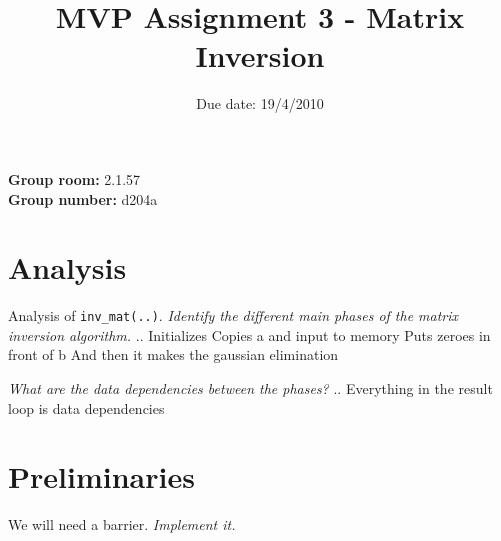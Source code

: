 \documentclass{article}
\title{MVP Assignment 3 - Matrix Inversion}
\date{Due date: 19/4/2010}
\begin{document}
\maketitle


\newcommand{\question}[1]{}
\newcommand{\answer}[1]{{#1}}

%
%
\answer{
\begin{flushleft}
{\bf Group room:} 2.1.57\\
{\bf Group number:} d204a\\
\end{flushleft}
}

\section{Analysis}

\question{
First we will analyse the code from \texttt{pmatrics.c} that you
discovered in the previous assignment. The example has been updated
for this assignment. The purpose is to parallize it using
\emph{pthreads}. The code supplied contains helpful comments.}

\begin{ExerciseList}
  \Exercise Analysis of \verb+inv_mat(..)+.
  \Question \emph{Identify the different main phases of the matrix
    inversion algorithm.}
  \Answer .. Initializes
  Copies a and input to memory
  Puts zeroes in front of b
  And then it makes the gaussian elimination

  \Question \emph{What are the data dependencies between the phases?}
  \Answer .. Everything in the result loop is data dependencies

\end{ExerciseList}

\section{Preliminaries}

\question{
Copy your matrix multiplication code from assignments 1 and 2 in the
relevant matrix multiplication functions place holders.}

\begin{ExerciseList}
\Exercise We will need a barrier.
\Question \emph{Implement it.}
\end{ExerciseList}
\end{document}
